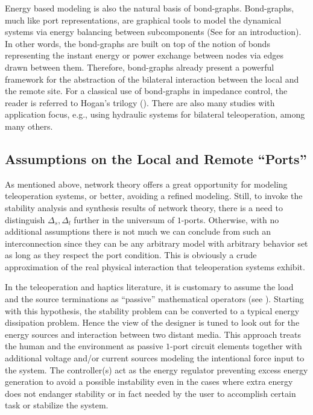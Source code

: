 Energy based modeling is also the natural basis of bond-graphs. Bond-graphs, much like port representations, are graphical tools 
to model the dynamical systems via energy balancing between subcomponents (See \cite{gawthrop} for an introduction). In other words, 
the bond-graphs are built on top of the notion of bonds representing the instant energy or power exchange between nodes via edges 
drawn between them. Therefore, bond-graphs already present a powerful framework for the abstraction of the bilateral interaction between 
the local and the remote site. For a classical use of bond-graphs in impedance control, the reader is referred to Hogan's trilogy 
(\cite{hogan:1,hogan:2,hogan:3}). There are also many studies with application focus, e.g., \cite{krishnaswamy} using hydraulic 
systems for bilateral teleoperation, among many others. 



\subsection{Assumptions on the Local and Remote \enquote{Ports}}

As mentioned above, network theory offers a great opportunity for modeling teleoperation systems, or better, avoiding 
a refined modeling. Still, to invoke the stability analysis and synthesis results of network theory, there is a need 
to distinguish $\Delta_s,\Delta_l$ further in the universum of $1$-ports. Otherwise, with no additional assumptions
there is not much we can conclude from such an interconnection since they can be any arbitrary model with arbitrary 
behavior set as long as they respect the port condition. This is obviously a crude approximation of the real physical 
interaction that teleoperation systems exhibit. 

In the teleoperation and haptics literature, it is customary to assume the load and the source terminations as \enquote{passive}
mathematical operators (see ). Starting with this hypothesis, the stability problem can be converted to 
a typical energy dissipation problem. Hence the view of the designer is tuned to look out for the energy sources and interaction 
between two distant media. This approach treats the human and the environment as passive $1$-port circuit elements together with 
additional voltage and/or current sources modeling the intentional force input to the system. The controller(s) act as the energy regulator 
preventing excess energy generation to avoid a possible instability even in the cases where extra energy does not endanger 
stability or in fact needed by the user to accomplish certain task or stabilize the system. 


